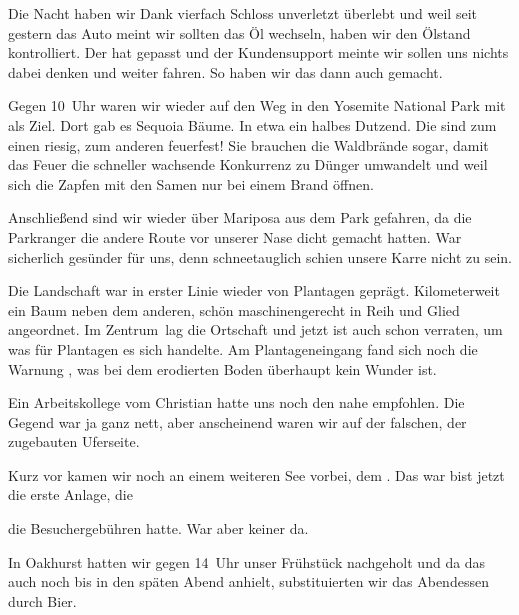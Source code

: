 Die Nacht haben wir Dank vierfach Schloss unverletzt überlebt und weil seit gestern das Auto meint wir sollten das Öl wechseln, haben wir den Ölstand kontrolliert.
Der hat gepasst und der Kundensupport meinte wir sollen uns nichts dabei denken und weiter fahren.
So haben wir das dann auch gemacht.

Gegen 10~Uhr waren wir wieder auf den Weg in den Yosemite National Park mit  als Ziel.
Dort gab es Sequoia Bäume.
In etwa ein halbes Dutzend.
Die sind zum einen riesig, zum anderen feuerfest!
Sie brauchen die Waldbrände sogar, damit das Feuer die schneller wachsende Konkurrenz zu Dünger umwandelt und weil sich die Zapfen mit den Samen nur bei einem Brand öffnen.

Anschließend sind wir wieder über Mariposa aus dem Park gefahren, da die Parkranger die andere Route vor unserer Nase dicht gemacht hatten.
War sicherlich gesünder für uns, denn schneetauglich schien unsere Karre nicht zu sein.

Die Landschaft war in erster Linie wieder von Plantagen geprägt.
Kilometerweit ein Baum neben dem anderen, schön maschinengerecht in Reih und Glied angeordnet.
Im \glqq Zentrum\grqq \, lag die Ortschaft  und jetzt ist auch schon verraten, um was für Plantagen es sich handelte.
Am Plantageneingang fand sich noch die Warnung , was bei dem erodierten Boden überhaupt kein Wunder ist.

Ein Arbeitskollege vom Christian hatte uns noch den  nahe  empfohlen.
Die Gegend war ja ganz nett, aber anscheinend waren wir auf der falschen, der zugebauten Uferseite.

Kurz vor  kamen wir noch an einem weiteren See vorbei, dem .
Das war bist jetzt die erste Anlage, die


\vspace*{.35\paperheight}
\noindent
die Besuchergebühren hatte.
War aber keiner da.

In Oakhurst hatten wir gegen 14~Uhr unser Frühstück nachgeholt und da das auch noch bis in den späten Abend anhielt, substituierten wir das Abendessen durch Bier.
